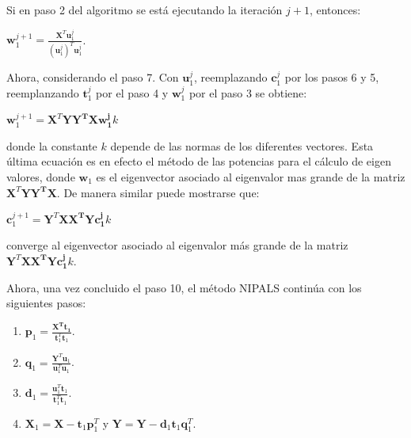 Si en paso 2 del algoritmo se está ejecutando la iteración $j +1 $, entonces: 

\begin{center}
$\mathbf{w}_{1}^{j+1} = \frac{\mathbf{X}^{T}\mathbf{u}_{1}^{j}}{(\mathbf{u}_{1}^{j})^{T}\mathbf{u}_{1}^{j}}$. 
\end{center}

Ahora, considerando el paso 7. Con $\mathbf{u}_{1}^{j}$, reemplazando $\mathbf{c}_{1}^{j}$ por los pasos 6 y 5, reemplanzando $\mathbf{t}_{1}^{j}$ por el paso 4 y $\mathbf{w}_{1}^{j}$ por el paso 3 se obtiene: 

\begin{center}
$\mathbf{w}_{1}^{j+1} = \mathbf{X}^{T}\mathbf{YY^{T}Xw_{1}^{j}} k$
\end{center}

donde la constante $k$ depende de las normas de los diferentes vectores. Esta última ecuación es en efecto el método de las potencias para el cálculo de eigen valores, donde $\mathbf{w}_{1}$ es el eigenvector asociado al eigenvalor mas grande de la matriz $\mathbf{X}^{T}\mathbf{YY^{T}X}$. De manera similar puede mostrarse que: 

\begin{center}
$\mathbf{c}_{1}^{j+1} = \mathbf{Y}^{T}\mathbf{XX^{T}Yc_{1}^{j}} k$
\end{center}

converge al eigenvector asociado al eigenvalor más grande de la matriz $\mathbf{Y}^{T}\mathbf{XX^{T}Yc_{1}^{j}} k$. 

Ahora, una vez concluido el paso 10, el método NIPALS continúa con los siguientes pasos: 

\begin{enumerate} 
\setcounter{enumi}{\theenumTemp}
\item $\mathbf{p}_{1} = \frac{\mathbf{X^{T}\mathbf{t}_{1}}}{\mathbf{t}_{1}^{T}\mathbf{t}_{1}}$.

\item $\mathbf{q}_{1} = \frac{\mathbf{Y}^{T}\mathbf{u}_{1}}{\mathbf{u}_{1}^{T}\mathbf{u}_{1}}$.

\item $\mathbf{d}_{1} = \frac{\mathbf{u}_{1}^{T}\mathbf{t}_{1}}{\mathbf{t}_{1}^{T}\mathbf{t}_{1}}$.
\item $\mathbf{X}_{1} = \mathbf{X} - \mathbf{t}_{1}\mathbf{p}_{1}^{T}$ y $\mathbf{Y} = \mathbf{Y} - \mathbf{d}_{1}\mathbf{t}_{1}\mathbf{q}_{1}^{T}$.


\end{enumerate}

